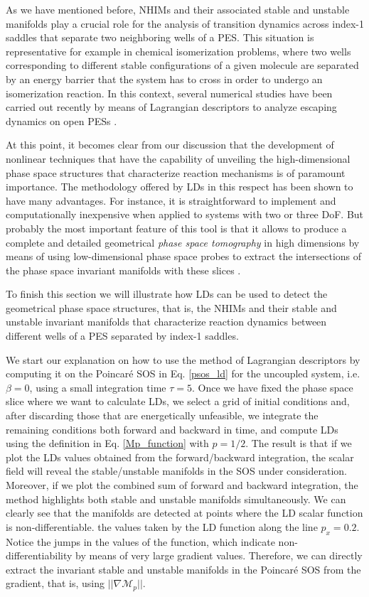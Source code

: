 \documentclass[8pt]{article}
\begin{document}
As we have mentioned before, NHIMs and their associated stable and unstable manifolds play a crucial role for the analysis of transition dynamics across index-1 saddles that separate two neighboring wells of a PES. This situation is representative for example in chemical isomerization problems, where two wells corresponding to different stable configurations of a given molecule are separated by an energy barrier that the system has to cross in order to undergo an isomerization reaction. In this context, several numerical studies have been carried out recently by means of Lagrangian descriptors to analyze escaping dynamics on open PESs \cite{demian2017,naik2019b,GG2019}. 

At this point, it becomes clear from our discussion that the development of nonlinear techniques that have the capability of unveiling the high-dimensional phase space structures that characterize reaction mechanisms is of paramount importance. The methodology offered by LDs in this respect has been shown to have many advantages. For instance, it is straightforward to implement and computationally inexpensive when applied to systems with two or three DoF. But probably the most important feature of this tool is that it allows to produce a complete and detailed geometrical \textit{phase space tomography} in high dimensions by means of using low-dimensional phase space probes to extract the intersections of the phase space invariant manifolds with these slices \cite{demian2017,naik2019a,naik2019b,GG2019}. 

To finish this section we will illustrate how LDs can be used to detect the geometrical phase space structures, that is, the NHIMs and their stable and unstable invariant manifolds that characterize reaction dynamics between different wells of a PES separated by index-1 saddles.


We start our explanation on how to use the method of Lagrangian descriptors by computing it on the Poincar\'e SOS in Eq. \eqref{psos_ld} for the uncoupled system, i.e. $\beta = 0$, using a small integration time $\tau = 5$. Once we have fixed the phase space slice where we want to calculate LDs, we select a grid of initial conditions and, after discarding those that are energetically unfeasible, we integrate the remaining conditions both forward and backward in time, and compute LDs using the definition in Eq. \eqref{Mp_function} with $p = 1/2$. The result is that if we plot the LDs values obtained from the forward/backward integration, the scalar field will reveal the stable/unstable manifolds in the SOS under consideration. Moreover, if we plot the combined sum of forward and backward integration, the method highlights both stable and unstable manifolds simultaneously. We can clearly see that the manifolds are detected at points where the LD scalar function is non-differentiable. the values taken by the LD function along the line $p_x = 0.2$. Notice the jumps in the values of the function, which indicate non-differentiability by means of very large gradient values. Therefore, we can directly extract the invariant stable and unstable manifolds in the Poincar\'e SOS from the gradient, that is, using $||\nabla \mathcal{M}_p||$. 
\end{document}
